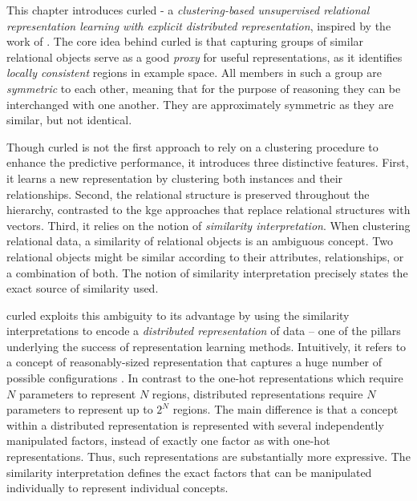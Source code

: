 This chapter introduces \gls{curled} - a \textit{clustering-based unsupervised relational representation learning with explicit distributed representation}, inspired by the work of \cite{coates2011analysis}.
The core idea behind \gls{curled} is that capturing groups of similar relational objects serve as a good \textit{proxy} for useful representations, as it identifies \textit{locally consistent} regions in example space.
All members in such a group are \textit{symmetric} to each other, meaning that for the purpose of reasoning they can be interchanged with one another.
They are approximately symmetric as they are similar, but not identical.



Though \gls{curled} is not the first approach to rely on a clustering procedure to enhance the predictive performance, it introduces three distinctive features.
First, it learns a new representation by clustering both instances and their relationships.
Second, the relational structure is  preserved throughout the hierarchy, contrasted to the \gls{kge} approaches that replace relational structures with vectors.
Third, it relies on the notion of \textit{similarity interpretation}.
When clustering relational data, a similarity of relational objects is an ambiguous concept.
Two relational objects might be similar according to their attributes, relationships, or a combination of both.
The notion of similarity interpretation precisely states the exact source of similarity used.



\gls{curled} exploits this ambiguity to its advantage by using the similarity interpretations to encode a \textit{distributed representation} of data -- one of the pillars underlying the success of representation learning methods.
Intuitively, it refers to a concept of  reasonably-sized representation that captures a huge number of possible configurations \cite{Bengio2013RLR}.
In contrast to the one-hot representations which require $N$ parameters to represent $N$ regions,  distributed representations require $N$ parameters to represent up to $2^N$ regions.
The main difference is that a concept within a distributed representation is represented with several independently manipulated factors, instead of exactly one factor as with one-hot representations.
Thus, such representations are substantially more expressive.
The similarity interpretation defines the exact factors that can be manipulated individually to represent individual concepts.



